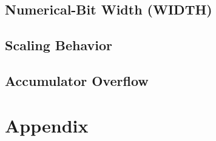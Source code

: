 \documentclass[a4paper,11pt]{article}
\begin{document}
\subsection{Numerical-Bit Width (WIDTH)}

\subsection{Scaling Behavior}




\subsection{Accumulator Overflow}





\section{Appendix}
\end{document}
